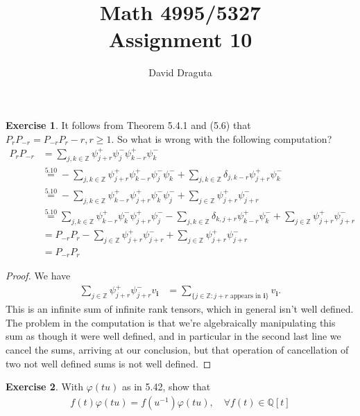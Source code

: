 \documentclass[12pt]{extarticle}
\title{ Math 4995/5327
  \\
  Assignment 10}
\author{David Draguta}
\newcommand{\set}[1]{\{#1\}}
\newcommand{\Q}{\mathbb{Q}}
\newcommand{\Z}{\mathbb{Z}}
\newcommand{\<}{\langle}
\renewcommand{\>}{\rangle}
\theoremstyle{definition}
\newtheorem{exercise}{Exercise}
\begin{document}
\maketitle

\begin{exercise}
  It follows from Theorem 5.4.1 and (5.6) that $P_{r}P_{-r} = P_{-r}P_r - r, r \geq 1.$ So what is wrong with the following computation?
  \begin{align*}
    P_r P_{-r}
    &= \sum\limits_{j,k \in \Z} \psi_{j+r}^+ \psi_{j}^-\psi_{k-r}^+\psi_k^- \\
    &\overset{5.10}{=} - \sum\limits_{j,k \in \Z} \psi_{j+r}^+\psi_{k-r}^+\psi_j^-\psi_k^- + \sum\limits_{j,k \in \Z} \delta_{j,k-r}\psi_{j+r}^+\psi_k^- \\
    &\overset{5.10}{=} - \sum\limits_{j,k \in \Z} \psi_{k-r}^+\psi_{j+r}^+\psi_k^-\psi_j^- + \sum\limits_{j \in \Z} \psi_{j+r}^+\psi_{j+r}^- \\
    &\overset{5.10}{=} \sum\limits_{j,k \in \Z} \psi_{k-r}^+\psi_{k}^-\psi_{j+r}^+\psi_j^- - \sum\limits_{j,k \in \Z} \delta_{k,j+r}\psi_{k-r}^+\psi_k^- + \sum\limits_{j \in \Z} \psi_{j+r}^+ \psi_{j+r}^- \\
    &= P_{-r}P_{r} - \sum\limits_{j \in \Z} \psi_{j +r}^+\psi_{j+r}^- + \sum\limits_{j \in \Z} \psi_{j+r}^+\psi_{j+r}^-  \\
    &= P_{-r}P_{r}
  \end{align*}
\end{exercise}
\begin{proof}
  We have 
  \begin{align*}
    \sum\limits_{j \in \Z} \psi_{j +r}^+\psi_{j+r}^- v_{\mathbf{i}}
    &=
    \sum\limits_{\set{j \in \Z: j+r \text{ appears in } \mathbf{i}}} v_{\mathbf{i}}.
  \end{align*}
  This is an infinite sum of infinite rank tensors, which in general isn't well defined. The problem in the computation is that we're algebraically manipulating this sum as though it were well defined, and in particular in the second last line we cancel the sums, arriving at our conclusion, but that operation of cancellation of two not well defined sums is not well defined.
\end{proof}
\newpage
\begin{exercise}
  With $\varphi(tu)$ as in 5.42, show that
  \begin{align*}
    f(t)\varphi(tu) = f(u^{-1})\varphi(tu), \quad \forall f(t) \in \Q[t]
  \end{align*}
\end{exercise}
\end{document}
